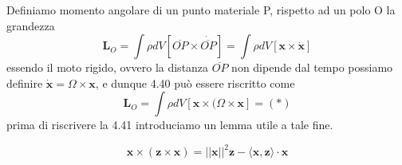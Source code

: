 Definiamo momento angolare di un punto materiale P, rispetto ad un polo O la grandezza 
\begin{equation}
	\bm{L}_{O} = \int \rho dV \left [ \overline{OP} \times \dot{\overline{OP}}\right] = \int \rho dV \left [ \bm{x} \times \dot{\bm{x}}\right ] 
\end{equation}
essendo il moto rigido, ovvero la distanza $\overline{OP}$ non dipende dal tempo possiamo definire $\bm{\dot{x}} = \Omega \times \bm{x}$, e dunque 4.40 pu\`{o} essere riscritto come
\begin{equation}
	\bm{L}_{O} = \int \rho dV \left [ \bm{x} \times (\Omega \times \bm{x} \right ] = (*)
\end{equation}
prima di riscrivere la 4.41 introduciamo un lemma utile a tale fine.
\begin{lemma}
	\begin{equation}
		\bm{x} \times (\bm{z} \times \bm{x}) = ||\bm{x}||^2 \bm{z} - \langle \bm{x},\bm{z}\rangle \cdot \bm{x}
	\end{equation}
\end{lemma}
